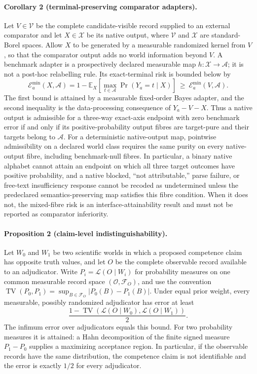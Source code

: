 \paragraph{Corollary 2 (terminal-preserving comparator adapters).}
Let $V\in\mathcal V$ be the complete candidate-visible record supplied to an
external comparator and let $X\in\mathcal X$ be its native output, where
$\mathcal V$ and $\mathcal X$ are standard-Borel spaces.  Allow $X$ to be
generated by a measurable randomized kernel from $V$, so that the comparator
output adds no world information beyond $V$.  A benchmark adapter is a
prospectively declared measurable map $h:\mathcal X\to\mathcal A$; it is not a
post-hoc relabelling rule.  Its exact-terminal
risk is bounded below by
\[
  \mathcal{E}_a^{\min}(X,\mathcal A)=1-\mathbb E_X\!\left[
    \max_{t\in\mathcal A}\Pr(Y_a=t\mid X)
  \right]
  \ \ge\ \mathcal{E}_a^{\min}(V,\mathcal A).
\]
The first bound is attained by a measurable fixed-order Bayes adapter, and the
second inequality is the data-processing consequence of $Y_a-V-X$.  Thus a
native output is admissible for a three-way exact-axis endpoint with zero
benchmark error if and only if its positive-probability output fibres are
target-pure and their targets belong to $\mathcal A$.  For a deterministic
native-output map, pointwise admissibility on a declared world class requires
the same purity on every native-output fibre, including benchmark-null fibres.
In particular, a binary native
alphabet cannot attain an endpoint on which all three target outcomes have
positive probability, and a native blocked, ``not attributable,'' parse
failure, or free-text insufficiency response cannot be recoded as
undetermined unless the predeclared semantics-preserving map satisfies
this fibre condition.  When it does not, the mixed-fibre risk is an
interface-attainability result and must not be reported as comparator
inferiority.

\paragraph{Proposition 2 (claim-level indistinguishability).}
Let $W_0$ and $W_1$ be two scientific worlds in which a proposed competence
claim has opposite truth values, and let $O$ be the complete observable record
available to an adjudicator.  Write $P_i=\mathcal L(O\mid W_i)$ for probability
measures on one common measurable record space $(\mathcal O,\mathcal F_O)$, and
use the convention
$\operatorname{TV}(P_0,P_1)=\sup_{B\in\mathcal F_O}|P_0(B)-P_1(B)|$.
Under equal prior weight, every measurable, possibly randomized adjudicator has
error at least
\begin{equation}
  \frac{1-\operatorname{TV}
  (\mathcal{L}(O\mid W_0),\mathcal{L}(O\mid W_1))}{2}.
  \label{eq:claim-identifiability-bound}
\end{equation}
The infimum error over adjudicators equals this bound.  For two probability
measures it is attained: a Hahn decomposition of the finite signed measure
$P_1-P_0$ supplies a maximizing acceptance region.  In particular, if the
observable records have the same distribution, the competence claim is not
identifiable and the error is exactly $1/2$ for every adjudicator.


